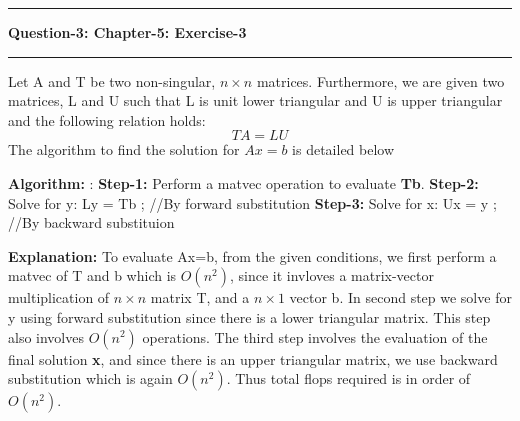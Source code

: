 \documentclass{article}
\newcommand\question[2]{\vspace{.25in}\hrule\textbf{#1: #2}\hrule\vspace{.10in}}
\newcommand\algo{\vspace{.10in}\textbf{Algorithm: }}
\begin{document}
\question{Question-3}{Chapter-5: Exercise-3}
Let A and T be two non-singular, $n \times n$ matrices. Furthermore, we are given two matrices, L and U such that L is unit lower triangular and U is upper triangular and the following relation holds: \newline
\begin{equation}
   TA = LU
\end{equation}
The algorithm to find the solution for $Ax=b$ is detailed below

\algo:\newline
\textbf {Step-1:} Perform a matvec operation to evaluate \textbf {Tb}. \newline
\textbf {Step-2:} Solve for y: Ly = Tb ; //By forward substitution \newline
\textbf {Step-3:} Solve for x: Ux = y ; //By backward substituion \newline

  \textbf {Explanation: } To evaluate Ax=b, from the given conditions, we first perform a matvec of T and b which is $O(n^2)$, since it invloves a matrix-vector multiplication of $n \times n$ matrix T, and a $n \times 1$ vector b. In second step we solve for y using forward substitution since there is a lower triangular matrix. This step also involves $O(n^2)$ operations. The third step involves the evaluation of the final solution \textbf {x}, and since there is an upper triangular matrix, we use backward substitution which is again $O(n^2)$. Thus total flops required is in order of $O(n^2)$. \newline
\end{document}
